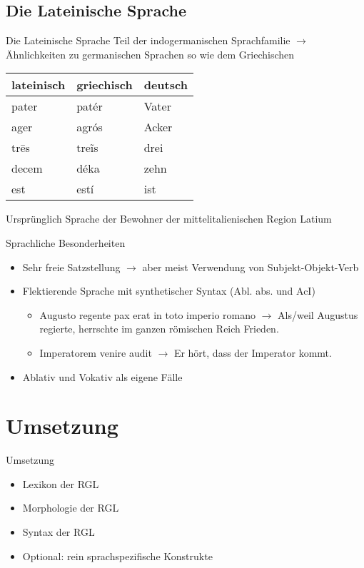 \documentclass{beamer}
\begin{document}
\subsection{Die Lateinische Sprache}
\begin{frame}[fragile]{Die Lateinische Sprache}
Teil der indogermanischen Sprachfamilie $\rightarrow$ Ähnlichkeiten zu germanischen Sprachen so wie dem Griechischen \\
\begin{center}
\begin{tabular}{|l|l|l|}
  \hline
  lateinisch & griechisch & deutsch \\
  \hline
  pater & patér & Vater \\
  ager & agrós & Acker \\
  trēs & treĩs & drei \\
  decem & déka & zehn \\
  est & estí & ist \\
  \hline
\end{tabular}
\end{center}
Ursprünglich Sprache der Bewohner der mittelitalienischen Region Latium
\end{frame}
\begin{frame}{Sprachliche Besonderheiten}
\begin{itemize}
  \item Sehr freie Satzstellung $\rightarrow$ aber meist Verwendung von Subjekt-Objekt-Verb
  \item Flektierende Sprache mit synthetischer Syntax (Abl. abs. und AcI)
    \begin{itemize}
      \item Augusto regente pax erat in toto imperio romano $\rightarrow$ Als/weil Augustus regierte, herrschte im ganzen römischen Reich Frieden.
      \item Imperatorem venire audit $\rightarrow$ Er hört, dass der Imperator kommt.
    \end{itemize}
  \item Ablativ und Vokativ als eigene Fälle
\end{itemize}
\end{frame}
\section{Umsetzung}
\begin{frame}{Umsetzung}
\begin{itemize}
  \item Lexikon der RGL
  \item Morphologie der RGL
  \item Syntax der RGL
  \item Optional: rein sprachspezifische Konstrukte
\end{itemize}
\end{frame}
\end{document}
